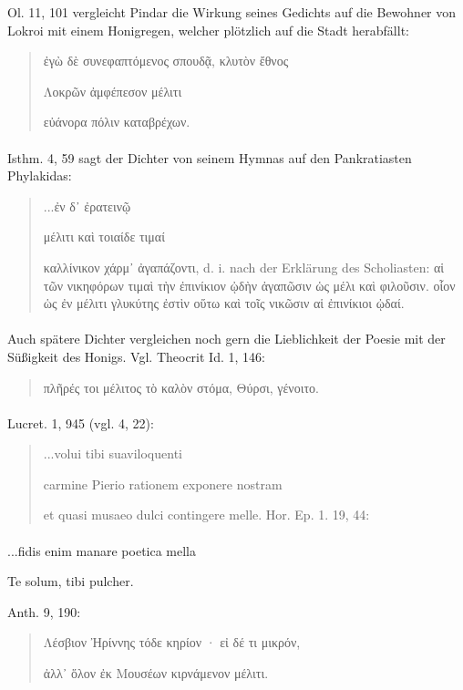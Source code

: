 \documentclass[a4paper, 11pt, oneside]{article}
\begin{document}
Ol. 11, 101 vergleicht Pindar die Wirkung seines Gedichts auf die Bewohner von Lokroi mit einem Honigregen, welcher plötzlich auf die Stadt herabfällt:
\begin{quotation}\large
ἐγὼ δὲ συνεφαπτόμενος σπουδᾷ, κλυτὸν ἔθνος

Λοκρῶν ἀμφέπεσον μέλιτι

εὐάνορα πόλιν καταβρέχων.
\end{quotation}
\paragraph{}
Isthm. 4, 59 sagt der Dichter von seinem Hymnas auf den Pankratiasten Phylakidas:
\begin{quotation}\large
...ἐν δ᾽ ἐρατεινῷ

μέλιτι καὶ τοιαίδε τιμαί

καλλίνικον χάρμ᾽ ἀγαπάζοντι, d. i. nach der Erklärung des Scholiasten: αἱ τῶν νικηφόρων τιμαὶ τὴν ἐπινίκιον ᾠδὴν ἀγαπῶσιν ὡς μέλι καὶ φιλοῦσιν. οἷον ὡς ἐν μέλιτι γλυκύτης ἐστὶν οὕτω καὶ τοῖς νικῶσιν αἱ ἐπινίκιοι ᾠδαί.
\end{quotation}
\paragraph{}
Auch spätere Dichter vergleichen noch gern die Lieblichkeit der Poesie mit der Süßigkeit des Honigs. Vgl. Theocrit Id. 1, 146:
\begin{quotation}\large
πλῆρές τοι μέλιτος τὸ καλὸν στόμα, Θύρσι, γένοιτο.
\end{quotation}
\paragraph{}
Lucret. 1, 945 (vgl. 4, 22):
\begin{quotation}\large
...volui tibi suaviloquenti

carmine Pierio rationem exponere nostram

et quasi musaeo dulci contingere melle. 
Hor. Ep. 1. 19, 44:
\end{quotation}
\paragraph{}
...fidis enim manare poetica mella

Te solum, tibi pulcher.

Anth. 9, 190:
\begin{quotation}\large
Λέσβιον Ἠρίννης τόδε κηρίον · εἰ δέ τι μικρόν,

ἀλλ᾽ ὅλον ἐκ Μουσέων κιρνάμενον μέλιτι.
\end{quotation}
\end{document}
